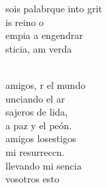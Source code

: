\begin{cancion}[Id y enseñad][Garabaín]
	sois palabrque into grit\\
	is reino o       \\
	 empia a engendrar\\
	sticia, am verda\\\jump\\
	\begin{chorus}%
	amigos, r el mundo\\
	unciando el ar\\
	sajeros de lida,\\
	a paz y el peón.\\
	amigos losestigos\\
	 mi resurreccn. \\
	llevando mi sencia\\
	vosotros esto\\
	\end{chorus}%
	\jump\\
\end{cancion}%
